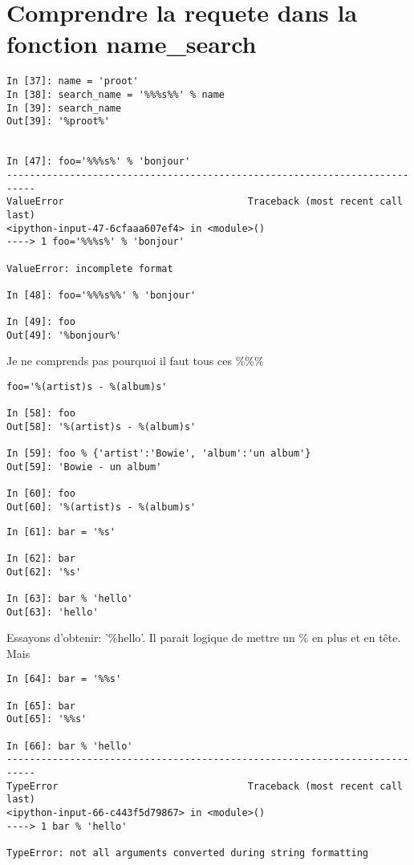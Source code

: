\documentclass[12pt,a4paper]{article}
\begin{document}
\section{Comprendre la requete dans la fonction name\_search}
\label{sec:namesearch}


\begin{verbatim}
In [37]: name = 'proot'
In [38]: search_name = '%%%s%%' % name                                                    
In [39]: search_name
Out[39]: '%proot%' 


In [47]: foo='%%%s%' % 'bonjour'
---------------------------------------------------------------------------
ValueError                                Traceback (most recent call last)
<ipython-input-47-6cfaaa607ef4> in <module>()
----> 1 foo='%%%s%' % 'bonjour'

ValueError: incomplete format

In [48]: foo='%%%s%%' % 'bonjour'

In [49]: foo
Out[49]: '%bonjour%'
\end{verbatim}

Je ne comprends pas pourquoi il faut tous ces \%\%\%


\begin{verbatim}
foo='%(artist)s - %(album)s'

In [58]: foo
Out[58]: '%(artist)s - %(album)s'

In [59]: foo % {'artist':'Bowie', 'album':'un album'}
Out[59]: 'Bowie - un album'

In [60]: foo
Out[60]: '%(artist)s - %(album)s'
\end{verbatim}

\begin{verbatim}
In [61]: bar = '%s'

In [62]: bar
Out[62]: '%s'

In [63]: bar % 'hello'
Out[63]: 'hello'
\end{verbatim}


Essayons d'obtenir: '\%hello'. Il parait logique de mettre un \%  en plus et en tête. Mais
\begin{verbatim}
In [64]: bar = '%%s'

In [65]: bar
Out[65]: '%%s'

In [66]: bar % 'hello'
---------------------------------------------------------------------------
TypeError                                 Traceback (most recent call last)
<ipython-input-66-c443f5d79867> in <module>()
----> 1 bar % 'hello'

TypeError: not all arguments converted during string formatting
\end{verbatim}
\end{document}
